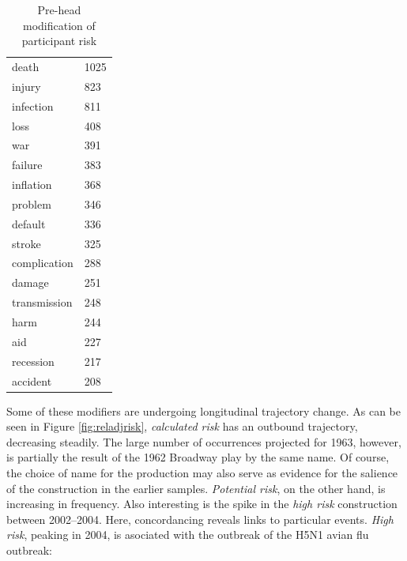 \begin{table}
{\begin{minipage}{0.35\textwidth}
\begin{tabular}{ll}
    death              & 1025  \\ 
    injury             & 823   \\ 
    infection          & 811   \\ 
    loss               & 408   \\ 
    war                & 391   \\ 
    failure            & 383   \\ 
    inflation          & 368   \\ 
    problem            & 346   \\ 
    default            & 336   \\ 
    stroke             & 325   \\ 
    complication       & 288   \\ 
    damage             & 251   \\ 
    transmission       & 248   \\ 
    harm               & 244   \\ 
    aid                & 227   \\ 
    recession          & 217   \\ 
    accident           & 208   \\ \bottomrule
    \end{tabular}
    \caption{Pre-head modification of participant risk}
    \label{tab:posthead}
    \end{minipage}}
    \end{table}

    Some of these modifiers are undergoing longitudinal trajectory change. As can be seen in Figure \ref{fig:reladjrisk}, \emph{calculated risk} has an outbound trajectory, decreasing steadily. The large number of occurrences projected for 1963, however, is partially the result of the 1962 Broadway play by the same name. Of course, the choice of name for the production may also serve as evidence for the salience of the construction in the earlier samples.  \emph{Potential risk}, on the other hand, is increasing in frequency. Also interesting is the spike in the \emph{high risk} construction between 2002--2004. Here, concordancing reveals links to particular events. \emph{High risk}, peaking in 2004, is asociated with the outbreak of the H5N1 avian flu outbreak: 


